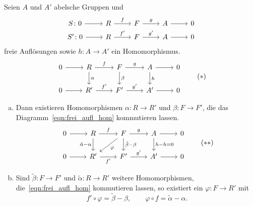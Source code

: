 \begin{lemma}
  Seien $A$ und $A'$ abelsche Gruppen und
  \begin{equation*}
    \begin{tikzcd}[row sep=tiny]
      S\colon 0  \arrow{r}{}  & R \arrow{r}{f}  & F \arrow{r}{g}  & A \arrow{r}{} & 0 \\
      S'\colon 0 \arrow{r}{}  & R \arrow{r}{f'} & F \arrow{r}{g'} & A \arrow{r}{} & 0
    \end{tikzcd}
  \end{equation*}
  freie Auflösungen sowie $h\colon A \to A'$ ein Homomorphismus.
  \begin{equation*}
    \begin{tikzcd}
      0 \arrow{r}{} & R   \arrow{d}{\alpha}
                          \arrow{r}{f}  & F   \arrow{d}{\beta}
                                              \arrow{r}{g}  & A   \arrow{d}{h}
                                                                  \arrow{r}{} & 0 \\
      0 \arrow{r}{} & R'  \arrow{r}{f'} & F'  \arrow{r}{g'} & A'  \arrow{r}{} & 0
    \end{tikzcd}
    \tag{$*$}\label{eqn:frei_aufl_hom}
  \end{equation*}
  \begin{enumerate}[(a)]
    \item
      Dann existieren Homomorphismen $\alpha \colon R \to R'$ und $\beta \colon F \to F'$, die das Diagramm~\eqref{eqn:frei_aufl_hom} kommutieren lassen.
      \begin{equation*}
        \begin{tikzcd}
      0 \arrow{r}{} & R   \arrow[swap]{d}{\tilde\alpha - \alpha}
                          \arrow{r}{f}  & F   \arrow{d}{\tilde\beta - \beta}
                                              \arrow{dl}{\varphi}
                                              \arrow{r}{g}  & A   \arrow{d}{h-h = 0}
                                                                  \arrow{r}{} & 0 \\
      0 \arrow{r}{} & R'  \arrow[swap]{r}{f'} & F'  \arrow{r}{g'} & A'  \arrow{r}{} & 0
        \end{tikzcd}
        \tag{$**$}\label{eqn:frei_aufl_homotopie}
      \end{equation*}
    \item
      Sind $\tilde\beta \colon F \to F'$ und $\tilde\alpha \colon R \to R'$ weitere Homomorphismen, die~\eqref{eqn:frei_aufl_hom} kommutieren lassen, so existiert ein $\varphi \colon F \to R'$ mit
      \begin{equation*}
        f' \circ \varphi = \tilde\beta - \beta, \qquad \varphi \circ f = \tilde\alpha - \alpha.
      \end{equation*}
  \end{enumerate}
\end{lemma}
